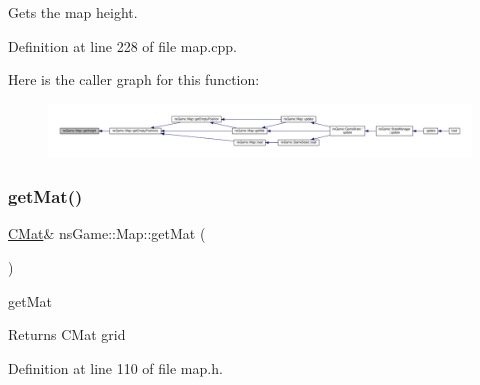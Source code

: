 Gets the map height. 



Definition at line 228 of file map.\+cpp.

Here is the caller graph for this function\+:\nopagebreak
\begin{figure}[H]
\begin{center}
\leavevmode
\includegraphics[width=350pt]{classns_game_1_1_map_a8ae7e6fe93f1318c0d7d2569e73ec144_icgraph}
\end{center}
\end{figure}
\mbox{\label{classns_game_1_1_map_a2cbbebf0522026dff6cfbb0236fe5150}} 
\subsubsection{\texorpdfstring{get\+Mat()}{getMat()}}
{\footnotesize\ttfamily \hyperlink{type_8h_a64a592133575ccebb1b36453acbec02b}{C\+Mat}\& ns\+Game\+::\+Map\+::get\+Mat (\begin{DoxyParamCaption}{ }\end{DoxyParamCaption})\hspace{0.3cm}{\ttfamily [inline]}}



get\+Mat 

\begin{DoxyReturn}{Returns}
C\+Mat grid 
\end{DoxyReturn}


Definition at line 110 of file map.\+h.

